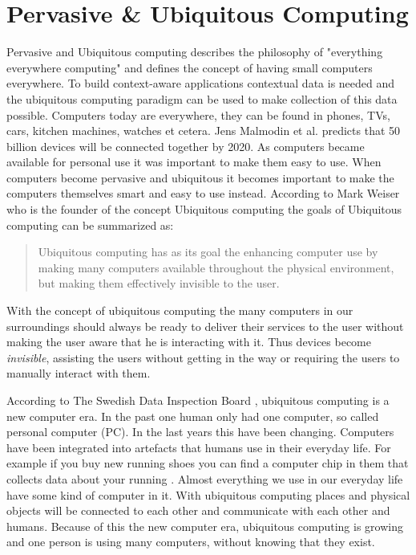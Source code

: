 \section{Pervasive \& Ubiquitous Computing}
Pervasive and Ubiquitous computing describes the philosophy of "everything everywhere computing" and defines the concept of having small computers everywhere. To build context-aware applications contextual data is needed and the ubiquitous computing paradigm can be used to make collection of this data possible.
Computers today are everywhere, they can be found in phones, TVs, cars, kitchen machines, watches et cetera. Jens Malmodin et al. \cite{fehske2011global} predicts that 50 billion devices will be connected together by 2020. As computers became available for personal use it was important to make them easy to use. When computers become pervasive and ubiquitous it becomes important to make the computers themselves smart and easy to use instead. According to Mark Weiser who is the founder of the concept Ubiquitous computing the goals of Ubiquitous computing can be summarized as: 

\begin{quotation}
Ubiquitous computing has as its goal the enhancing computer use by making many computers available throughout the physical environment, but making them effectively invisible to the user. \cite{237456}
\end{quotation}

With the concept of ubiquitous computing the many computers in our surroundings should always be ready to deliver their services to the user without making the user aware that he is interacting with it. Thus devices become \emph{invisible}, assisting the users without getting in the way or requiring the users to manually interact with them. 

According to The Swedish Data Inspection Board \cite{datainspect}, ubiquitous computing is a new computer era. In the past one human only had one computer, so called personal computer (PC). In the last years this have been changing. Computers have been integrated into artefacts that humans use in their everyday life. For example if you buy new running shoes you can find a computer chip in them that collects data about your running \cite{saponas2006devices}. Almost everything we use in our everyday life have some kind of computer in it. With ubiquitous computing places and physical objects will be connected to each other and communicate with each other and humans. Because of this the new computer era, ubiquitous computing is growing and one person is using many computers, without knowing that they exist. 

